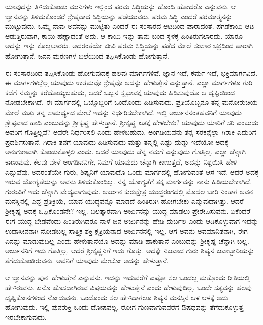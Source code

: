 ಯಾವುದನ್ನು ತಿಳಿದುಕೊಂಡು ಮುನಿಗಳು ಇಲ್ಲಿಂದ ಪರಮ ಸಿದ್ಧಿಯನ್ನು ಹೊಂದಿ ಹೋದರೊ ಎನ್ನುವನು. ಆ ಜ್ಞಾನವನ್ನು ತಿಳಿದುಕೊಂಡರೆ ಶ್ರೇಷ್ಠವಾದ ಸಿದ್ಧಿಯನ್ನು ಪಡೆಯುವರು. ಪರಮ ಸಿದ್ಧಿ ಎಂದರೆ ಪರಮಾತ್ಮನನ್ನು ಮುಟ್ಟುವುದು. ಒಮ್ಮೆ ನಾವು ಅವನನ್ನು ಮುಟ್ಟಿತು ಎಂದರೆ ಈ ಸಂಸಾರದ ಆಟದಿಂದ ಪಾರಾದಂತೆ. ಪಗಡೆಕಾಯಿ ಆಟ ಆಡುತ್ತಿರುವಾಗ, ಕಾಯಿ ಹಣ್ಣಾದಂತೆ ಅದು. ಆ ಕಾಯಿ ಇನ್ನು ತಾನು ಬಂದ ಸ್ಥಳಕ್ಕೆ ಹಿಂತಿರುಗಲಾರದು. ಯಾರೂ ಅದನ್ನು ಇನ್ನು ಕೊಲ್ಲಲಾರರು. ಅದರಂತೆಯೇ ಜೀವಿ ಪರಮ ಸಿದ್ಧಿಯನ್ನು ಪಡೆದ ಮೇಲೆ ಸಂಸಾರ ಚಕ್ರದಿಂದ ಪಾರಾಗಿ ಹೋಗುತ್ತಾನೆ. ಜನನ ಮರಣಗಳ ಬಲೆಯಿಂದ ತಪ್ಪಿಸಿಕೊಂಡು ಹೋಗುತ್ತಾನೆ.

ಈ ಸಂಸಾರದಿಂದ ತಪ್ಪಿಸಿಕೊಂಡು ಹೋಗುವುದಕ್ಕೆ ಹಲವು ಮಾರ್ಗಗಳಿವೆ. ಜ್ಞಾನ ಇದೆ, ಕರ್ಮ ಇದೆ, ಭಕ್ತಿಮಾರ್ಗವಿದೆ. ಈ ಮಾರ್ಗಗಳಲ್ಲೆಲ್ಲ ಯಾವುದು ಉತ್ತಮವೊ ಶ್ರೇಷ್ಠವೊ ಅದನ್ನು ಹೇಳುತ್ತೇನೆ ಎನ್ನುತ್ತಾನೆ. ಎಲ್ಲಾ ಮಾರ್ಗಗಳೂ ಗುರಿ ಕಡೆಗೆ ನಮ್ಮನ್ನು ಕರೆದೊಯ್ಯಬಹುದು, ಆದರೆ ಒಬ್ಬನ ಸ್ವಭಾವಕ್ಕೆ ಯಾವುದು ಹಿಡಿಸುವುದೊ ಆ ದೃಷ್ಟಿಯಿಂದ ನೋಡಬೇಕಾಗಿದೆ. ಈ ಮಾರ್ಗದಲ್ಲಿ ಒಬ್ಬೊಬ್ಬರಿಗೆ ಒಂದೊಂದು ಹಿಡಿಸುವುದು. ಪ್ರತಿಯೊಬ್ಬನೂ ತನ್ನ ಮನೋರುಚಿಯ ಮೇಲೆ ಮತ್ತು ತನ್ನ ಸಾಮರ್ಥ್ಯದ ಮೇಲೆ ಇದನ್ನು ನಿರ್ಧರಿಸಬೇಕಾಗಿದೆ. ಇಲ್ಲಿ ಅರ್ಜುನನಂತಹವನಿಗೆ ಯಾವುದು ಶ್ರೇಷ್ಠವಾದ ಹಾದಿ ಎಂಬುದನ್ನು ಶ್ರೀಕೃಷ್ಣ ಹೇಳುತ್ತಾನೆ. ಶ್ರೀಕೃಷ್ಣ ಏತಕ್ಕೆ ಹೇಳಬೇಕು? ಯಾವುದು ಯಾರಿಗೆ ಸರಿ ಎಂಬುದು ಅವರಿಗೆ ಗೊತ್ತಿಲ್ಲವೆ? ಅವರೇ ನಿರ್ಧರಿಸಲಿ ಎಂದು ಹೇಳಬಹುದು. ಅಂಗಡಿಯವನು ತನ್ನ ಸರಕನ್ನೆಲ್ಲಾ ಗಿರಾಕಿ ಎದುರಿಗೆ ಪ್ರದರ್ಶಿಸುತ್ತಾನೆ. ಗಿರಾಕಿ ತನಗೆ ಯಾವುದು ಹಿಡಿಸುವುದು ಮತ್ತು ತನ್ನಲ್ಲಿ ಎಷ್ಟು ದುಡ್ಡು ಇದೆಯೋ ಅದಕ್ಕೆ ಅನುಗುಣವಾಗಿ ಕೊಂಡುಕೊಳ್ಳಲಿ ಎಂದು. ಆದರೆ ಯಾವುದು ಚೆನ್ನ ನಮಗೆ ಎನ್ನುವುದು ಗೊತ್ತಿಲ್ಲ. ಎಲ್ಲಾ ಚೆನ್ನಾಗಿ ಕಾಣುವುವು. ಕೆಲವು ವೇಳೆ ಅಂಗಡಿವನಿಗೇ, ನಿಮಗೆ ಯಾವುದು ಚೆನ್ನಾಗಿ ಕಾಣುತ್ತದೆ, ಅದನ್ನು ನಿಶ್ಚಯಿಸಿ ಹೇಳಿ ಎನ್ನುವೆವು. ಅದರಂತೆಯೇ ಗುರು, ಶಿಷ್ಯನಿಗೆ ಯಾವುದೊ ಒಂದು ಮಾರ್ಗದಲ್ಲಿ ಹೋಗುವಂತೆ ಆಸೆ ಇದೆ. ಆದರೆ ಅದಕ್ಕೆ ಇರುವ ಯೋಗ್ಯತೆಯನ್ನು ಅವನು ತಿಳಿದುಕೊಂಡಿಲ್ಲ. ನನ್ನ ಯೋಗ್ಯತೆಗೆ ತಕ್ಕ ಮಾರ್ಗವನ್ನು ನಾನು ಹಿಡಿಯಬೇಕಾಗಿದೆ. ಗುರುವಿಗೆ ಇದು ಚೆನ್ನಾಗಿ ವೇದ್ಯವಾಗುವುದು. ಅರ್ಜುನ ಕುರುಕ್ಷೇತ್ರ ಯುದ್ಧರಂಗದಲ್ಲಿ ಮೊದಲ ಬಾರಿ ನಿಂತಾಗ ಅವನ ಮನಸ್ಸಿನಲ್ಲಿ ಎದ್ದ ಪ್ರತಿಕ್ರಿಯೆ, ಯಾವ ಯುದ್ಧವನ್ನೂ ಮಾಡದೆ ಹಿಂತಿರುಗಿ ಹೋಗಬೇಕು ಎನ್ನುವುದಾಗಿತ್ತು. ಆದರೆ ಶ್ರೀಕೃಷ್ಣ ಅದಕ್ಕೆ ಒಪ್ಪಿಕೊಂಡನೇ? ಇಲ್ಲ. ಬಲತ್ಕಾರವಾಗಿ ಅರ್ಜುನನ್ನು ಯುದ್ಧ ಮಾಡಲು ಪ್ರೇರೇಪಿಸುವನು. ಏಕೆಂದರೆ ಈಗ ಯುದ್ಧ ಬೇಡವೆಂದು ಹಿಂತಿರುಗಿದರೂ ನಾಳೆ ಜನ ಅರ್ಜುನನ್ನು ಹೇಡಿ ದುರ್ಬಲ ಎಂದು ಆಡಿಕೊಳ್ಳುವಾಗ ಇದನ್ನು ಉದಾಸೀನನಾಗಿ ನೋಡಬಲ್ಲ ಸಾತ್ತ್ವಿಕ ಶಕ್ತಿ ಕ್ಷತ್ರಿಯನಾದ ಅರ್ಜುನನಲ್ಲಿ ಇಲ್ಲ. ಆಗ ಅವನು ಅವಮಾನಿತನಾಗಿ, ಈಗ ಏನನ್ನು ಮಾಡುವುದಿಲ್ಲ ಎಂದು ಹೇಳುತ್ತಾನೆಯೊ ಅದನ್ನು ಮಾಡಿ ಹಾಕುತ್ತಾನೆ ಎಂಬುದನ್ನು ಶ್ರೀಕೃಷ್ಣ ಚೆನ್ನಾಗಿ ಬಲ್ಲ. ಅರ್ಜುನನಿಗೆ ಇದು ಗೊತ್ತಿಲ್ಲ. ಆದರೆ ಶ್ರೀಕೃಷ್ಣನಿಗೆ ಇದು ಗೊತ್ತು. ಅದಕ್ಕೇ ನಿಜವಾದ ಗುರು ಶಿಷ್ಯನ ಜವಾಬ್ದಾರಿಯನ್ನು ತೆಗೆದುಕೊಂಡಿರುವನು. ಅವನಿಗೆ ಯಾವುದು ಮೇಲೋ ಅದನ್ನು ಹೇಳುತ್ತಾನೆ.

ಆ ಜ್ಞಾನವನ್ನು ಪುನಃ ಹೇಳುತ್ತೇನೆ ಎನ್ನುವನು. ಇದನ್ನು ಇದುವರೆಗೆ ಎಷ್ಟೋ ಸಲ ಒಂದಲ್ಲ ಮತ್ತೊಂದು ರೀತಿಯಲ್ಲಿ ಹೇಳಿರುವನು. ಏನೊ ಹೊಸದಾಗಿರುವ ವಿಷಯವನ್ನು ಹೇಳುತ್ತೇನೆ ಎಂದು ಹೇಳುವುದಿಲ್ಲ. ಒಂದೇ ಸತ್ಯವನ್ನು ಹಲವು ದೃಷ್ಟಿಕೋನಗಳಿಂದ ನೋಡುವನು. ಒಂದೊಂದು ಸಲ ಹೇಳಿದಾಗಲೂ ಶಿಷ್ಯನ ಮನಸ್ಸಿನ ಆಳ ಆಳಕ್ಕೆ ಅದು ಹೋಗುವುದು. ಇಲ್ಲಿ ಪುನರುಕ್ತಿ ಒಂದು ದೋಷವಲ್ಲ. ರೋಗ ಗುಣವಾಗುವವರೆಗೆ ಔಷಧವನ್ನು ತೆಗೆದುಕೊಳ್ಳುತ್ತ ಇರಬೇಕಾಗುವುದು.

